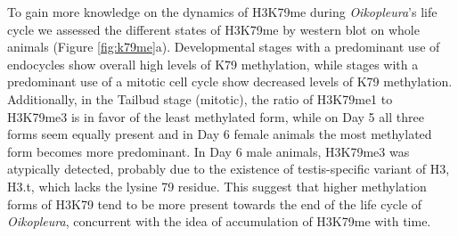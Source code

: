 \documentclass[11pt,twoside,a4paper]{report}
\begin{document}
	To gain more knowledge on the dynamics of H3K79me during \textit{Oikopleura}'s life cycle we assessed the different states of H3K79me by western blot on whole animals (Figure \ref{fig:k79me}a). Developmental stages with a predominant use of endocycles show overall high levels of K79 methylation, while stages with a predominant use of a mitotic cell cycle show decreased levels of K79 methylation. Additionally, in the Tailbud stage (mitotic), the ratio of H3K79me1 to H3K79me3 is in favor of the least methylated form, while on Day 5 all three forms seem equally present and in Day 6 female animals the most methylated form becomes more predominant. In Day 6 male animals, H3K79me3 was atypically detected, probably due to the existence of testis-specific variant of H3, H3.t, which lacks the lysine 79 residue. This suggest that higher methylation forms of H3K79 tend to be more present towards the end of the life cycle of \textit{Oikopleura}, concurrent with the idea of accumulation of H3K79me with time.
	
\end{document}
